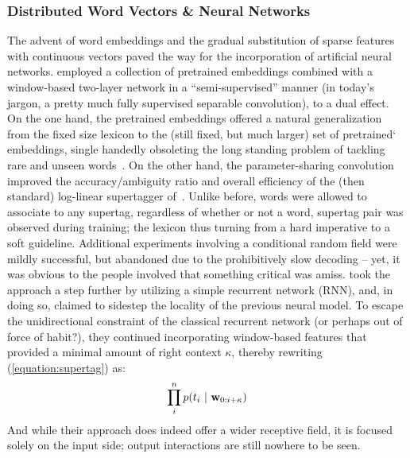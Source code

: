 \subsubsection{Distributed Word Vectors \& Neural Networks}
The advent of word embeddings and the gradual substitution of sparse features with continuous vectors paved the way for the incorporation of artificial neural networks.
\citet{10.1162/tacl_a_00186} employed a collection of pretrained embeddings combined with a window-based two-layer network in a ``semi-supervised'' manner (in today's jargon, a pretty much fully supervised separable convolution), to a dual effect.
On the one hand, the pretrained embeddings offered a natural generalization from the fixed size lexicon to the (still fixed, but much larger) set of pretrained` embeddings, single handedly obsoleting the long standing problem of tackling rare and unseen words~\cite{thomforde-steedman-2011-semi,deoskar-etal-2011-learning,deoskar2014generalizing}.
On the other hand, the parameter-sharing convolution improved the accuracy/ambiguity ratio and overall efficiency of the (then standard) log-linear supertagger of~\citet{clark2007wide}.
Unlike before, words were allowed to associate to any supertag, regardless of whether or not a \textlangle word, supertag\textrangle{} pair was observed during training; the lexicon thus turning from a hard imperative to a soft guideline.
Additional experiments involving a conditional random field were mildly successful, but abandoned due to the prohibitively slow decoding -- yet, it was obvious to the people involved that something critical was amiss.
\citet{xu-etal-2015-ccg} took the approach a step further by utilizing a simple recurrent network (RNN), and, in doing so, claimed to sidestep the locality of the previous neural model.
To escape the unidirectional constraint of the classical recurrent network (or perhaps out of force of habit?), they continued incorporating window-based features that provided a minimal amount of right context $\kappa$, thereby rewriting (\ref{equation:supertag}) as:
\begin{equation}
	\prod_i^n p(t_i \ | \ \seq{w}{0:i+\kappa})
\end{equation}
And while their approach does indeed offer a wider receptive field, it is focused solely on the input side; output interactions are still nowhere to be seen.

